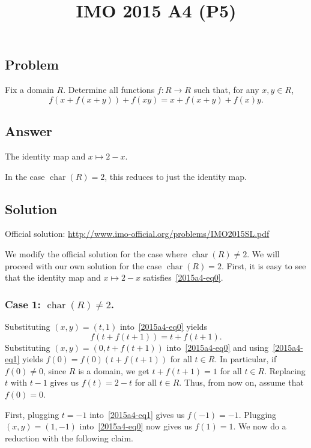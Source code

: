 \documentclass{article}
\title{IMO 2015 A4 (P5)}
\author{}
\date{}
\DeclareMathOperator{\rchar}{char}
\begin{document}
\maketitle



\subsection*{Problem}

Fix a domain $R$.
Determine all functions $f : R \to R$ such that, for any $x, y \in R$,
\[ f(x + f(x + y)) + f(xy) = x + f(x + y) + f(x) y. \tag{*}\label{2015a4-eq0} \]



\subsection*{Answer}

The identity map and $x \mapsto 2 - x$.

In the case $\rchar(R) = 2$, this reduces to just the identity map.



\subsection*{Solution}

Official solution: \url{http://www.imo-official.org/problems/IMO2015SL.pdf}

We modify the official solution for the case where $\rchar(R) \neq 2$.
We will proceed with our own solution for the case $\rchar(R) = 2$.
First, it is easy to see that the identity map and $x \mapsto 2 - x$ satisfies~\eqref{2015a4-eq0}.


\subsubsection*{Case 1: $\rchar(R) \neq 2$.}

Substituting $(x, y) = (t, 1)$ into~\eqref{2015a4-eq0} yields
\[ f(t + f(t + 1)) = t + f(t + 1). \tag{1}\label{2015a4-eq1} \]
Substituting $(x, y) = (0, t + f(t + 1))$ into~\eqref{2015a4-eq0} and using~\eqref{2015a4-eq1} yields $f(0) = f(0) (t + f(t + 1))$ for all $t \in R$.
In particular, if $f(0) \neq 0$, since $R$ is a domain, we get $t + f(t + 1) = 1$ for all $t \in R$.
Replacing $t$ with $t - 1$ gives us $f(t) = 2 - t$ for all $t \in R$.
Thus, from now on, assume that $f(0) = 0$.

First, plugging $t = -1$ into~\eqref{2015a4-eq1} gives us $f(-1) = -1$.
Plugging $(x, y) = (1, -1)$ into~\eqref{2015a4-eq0} now gives us $f(1) = 1$.
We now do a reduction with the following claim.
\end{document}
